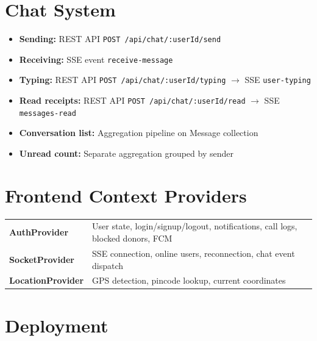 \documentclass[10pt,a4paper]{article}
\begin{document}
\section{Chat System}

\begin{itemize}
    \item \textbf{Sending:} REST API \texttt{POST /api/chat/:userId/send}
    \item \textbf{Receiving:} SSE event \texttt{receive-message}
    \item \textbf{Typing:} REST API \texttt{POST /api/chat/:userId/typing} $\rightarrow$ SSE \texttt{user-typing}
    \item \textbf{Read receipts:} REST API \texttt{POST /api/chat/:userId/read} $\rightarrow$ SSE \texttt{messages-read}
    \item \textbf{Conversation list:} Aggregation pipeline on Message collection
    \item \textbf{Unread count:} Separate aggregation grouped by sender
\end{itemize}

\section{Frontend Context Providers}

\begin{tabularx}{\textwidth}{@{}lX@{}}
\textbf{AuthProvider} & User state, login/signup/logout, notifications, call logs, blocked donors, FCM \\
\textbf{SocketProvider} & SSE connection, online users, reconnection, chat event dispatch \\
\textbf{LocationProvider} & GPS detection, pincode lookup, current coordinates \\
\end{tabularx}

\section{Deployment}
\end{document}
